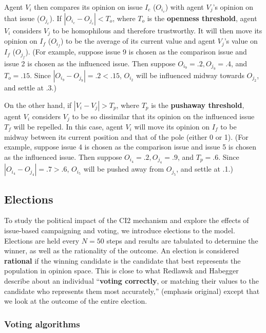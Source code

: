 Agent $V_i$ then compares its opinion on issue $I_c$ ($O_{i_c}$) with agent
$V_j$'s opinion on that issue ($O_{j_c}$). If $|O_{i_c} - O_{j_c}| < T_o$,
where $T_o$ is the \textbf{openness threshold}, agent $V_i$ considers $V_j$ to
be homophilous and therefore trustworthy. It will then move its opinion on
$I_f$ ($O_{i_f}$) to be the average of its current value and agent $V_j$'s
value on $I_f$ ($O_{j_f}$). (For example, suppose issue 9 is chosen as the
comparison issue and issue 2 is chosen as the influenced issue. Then suppose
$O_{i_9} = .2, O_{j_9} = .4$, and $T_o = .15$. Since $|O_{i_9} - O_{j_9}| = .2
< .15$, $O_{i_2}$ will be influenced midway towards $O_{j_2}$, and settle at
.3.)

On the other hand, if $|V_i - V_j| > T_p$, where $T_p$ is the \textbf{pushaway
threshold}, agent $V_i$ considers $V_j$ to be so dissimilar that its opinion on
the influenced issue $T_f$ will be repelled. In this case, agent $V_i$ will
move its opinion on $I_f$ to be midway between its current position and that of
the pole (either 0 or 1). (For example, suppose issue 4 is chosen as the
comparison issue and issue 5 is chosen as the influenced issue. Then suppose
$O_{i_4} = .2, O_{j_4} = .9$, and $T_p = .6$. Since $|O_{i_4} - O_{j_4}| = .7
> .6$, $O_{i_5}$ will be pushed away from $O_{j_5}$, and settle at .1.)


\subsection{Elections}


To study the political impact of the CI2 mechanism and explore the effects of
issue-based campaigning and voting, we introduce elections to the model.
Elections are held every $N=50$ steps and results
are tabulated to determine the winner, as well as the rationality of the
outcome. An election is considered \textbf{rational} if the winning candidate
is the candidate that best represents the population in opinion space. This is
close to what Redlawsk and Habegger describe about an individual
``\textbf{voting correctly}, or matching their values to the candidate who
represents them most accurately,''\cite[p.8]{redlawsk_citizens_2020} (emphasis
original) except that we look at the outcome of the entire election. 

\subsubsection{Voting algorithms}

